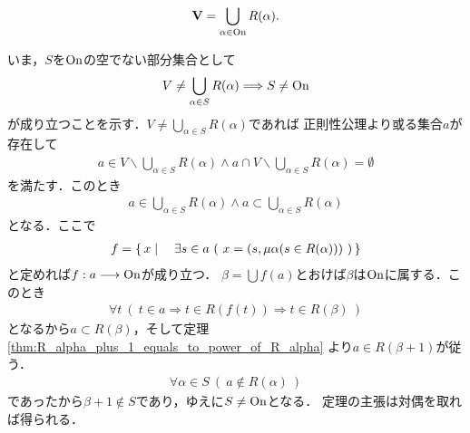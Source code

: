 	\begin{screen}
		\begin{thm}\label{thm:Universe_and_ordinal_numbers}
			\begin{align}
				\mathbf{V} = \bigcup_{\alpha \in \mathrm{On}} R(\alpha).
			\end{align}
		\end{thm}
	\end{screen}
	
	\begin{prf}
		いま，$S$を$\mathrm{On}$の空でない部分集合として
		\begin{align}
			V \neq \bigcup_{\alpha \in S} R(\alpha)
			\Longrightarrow S \neq \mathrm{On}
		\end{align}
		が成り立つことを示す．$V \neq \bigcup_{\alpha \in S} R(\alpha)$であれば
		正則性公理より或る集合$a$が存在して
		\begin{align}
			a \in V \backslash \bigcup_{\alpha \in S} R(\alpha)
			\wedge a \cap V \backslash \bigcup_{\alpha \in S} R(\alpha) = \emptyset
		\end{align}
		を満たす．このとき
		\begin{align}
			a \in \bigcup_{\alpha \in S} R(\alpha) \wedge a \subset \bigcup_{\alpha \in S} R(\alpha)
		\end{align}
		となる．ここで
		\begin{align}
			f = \left\{\, x \mid \quad \exists s \in a\ (\ x = (s,\mu \alpha (s \in R(\alpha)))\ )\, \right\}
		\end{align}
		と定めれば$f:a \longrightarrow \mathrm{On}$が成り立つ．
		$\beta = \bigcup f(a)$とおけば$\beta$は$\mathrm{On}$に属する．このとき
		\begin{align}
			\forall t\ (\ t \in a \Longrightarrow t \in R(f(t))
			\Longrightarrow t \in R(\beta)\ )
		\end{align}
		となるから$a \subset R(\beta)$，そして定理\ref{thm:R_alpha_plus_1_equals_to_power_of_R_alpha}
		より$a \in R(\beta + 1)$が従う．
		\begin{align}
			\forall \alpha \in S\ (\ a \notin R(\alpha)\ )
		\end{align}
		であったから$\beta + 1 \notin S$であり，ゆえに$S \neq \mathrm{On}$となる．
		定理の主張は対偶を取れば得られる．
		\QED
	\end{prf}
	
	
